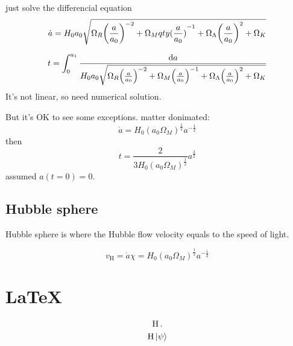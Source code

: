 just solve the differencial equation
\begin{equation}
    \dot{a} = H_0 a_0 \sqrt{\Omega_R {\qty(\frac{a}{a_0})}^{-2} + \Omega_M {qty(\frac{a}{a_0})}^{-1} + \Omega_\Lambda{\qty(\frac{a}{a_0})}^{2} + \Omega_K}
\end{equation}

\begin{equation}
    t = \int_{0}^{a_1}  \frac{\dd a}{H_0 a_0 \sqrt{\Omega_R {\qty(\frac{a}{a_0})}^{-2} + \Omega_M {\qty(\frac{a}{a_0})}^{-1} + \Omega_\Lambda {\qty(\frac{a}{a_0})}^{2} + \Omega_K}}
\end{equation}
It's not linear, so need numerical solution. 

But it's OK to see some  exceptions.
    matter donimated:
    \begin{equation}
        \dot{a} = H_0 {(a_0 \Omega_M)}^{\frac{1}{2}}  a^{-\frac{1}{2}} 
    \end{equation}
    then 
    \begin{equation}
        t = \frac{2}{3 H_0 {(a_0 \Omega_M)}^{\frac{1}{2}} } a^{\frac{3}{2}} 
    \end{equation}
    assumed $a(t=0)=0$.

\subsection{Hubble sphere}

Hubble sphere is where the Hubble flow velocity equals to the speed of light.

\begin{equation}
    v_{\mathrm{H}} = \dot{a} \chi 
    = H_0 {(a_0 \Omega_M)}^{\frac{1}{2}}  a^{-\frac{1}{2}}  
\end{equation}

\section*{\LaTeX}


\begin{gather}
    \operatorname{H}.\\
    \operatorname{H} \ket{\psi}
\end{gather}




